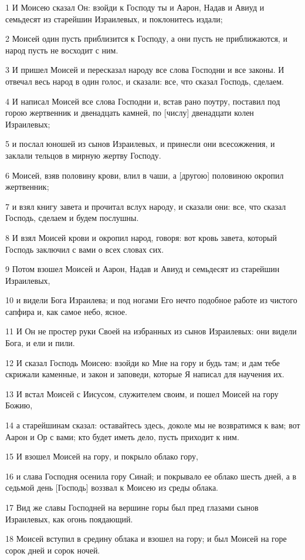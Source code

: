 \par 1 И Моисею сказал Он: взойди к Господу ты и Аарон, Надав и Авиуд и семьдесят из старейшин Израилевых, и поклонитесь издали;
\par 2 Моисей один пусть приблизится к Господу, а они пусть не приближаются, и народ пусть не восходит с ним.
\par 3 И пришел Моисей и пересказал народу все слова Господни и все законы. И отвечал весь народ в один голос, и сказали: все, что сказал Господь, сделаем.
\par 4 И написал Моисей все слова Господни и, встав рано поутру, поставил под горою жертвенник и двенадцать камней, по [числу] двенадцати колен Израилевых;
\par 5 и послал юношей из сынов Израилевых, и принесли они всесожжения, и заклали тельцов в мирную жертву Господу.
\par 6 Моисей, взяв половину крови, влил в чаши, а [другою] половиною окропил жертвенник;
\par 7 и взял книгу завета и прочитал вслух народу, и сказали они: все, что сказал Господь, сделаем и будем послушны.
\par 8 И взял Моисей крови и окропил народ, говоря: вот кровь завета, который Господь заключил с вами о всех словах сих.
\par 9 Потом взошел Моисей и Аарон, Надав и Авиуд и семьдесят из старейшин Израилевых,
\par 10 и видели Бога Израилева; и под ногами Его нечто подобное работе из чистого сапфира и, как самое небо, ясное.
\par 11 И Он не простер руки Своей на избранных из сынов Израилевых: они видели Бога, и ели и пили.
\par 12 И сказал Господь Моисею: взойди ко Мне на гору и будь там; и дам тебе скрижали каменные, и закон и заповеди, которые Я написал для научения их.
\par 13 И встал Моисей с Иисусом, служителем своим, и пошел Моисей на гору Божию,
\par 14 а старейшинам сказал: оставайтесь здесь, доколе мы не возвратимся к вам; вот Аарон и Ор с вами; кто будет иметь дело, пусть приходит к ним.
\par 15 И взошел Моисей на гору, и покрыло облако гору,
\par 16 и слава Господня осенила гору Синай; и покрывало ее облако шесть дней, а в седьмой день [Господь] воззвал к Моисею из среды облака.
\par 17 Вид же славы Господней на вершине горы был пред глазами сынов Израилевых, как огонь поядающий.
\par 18 Моисей вступил в средину облака и взошел на гору; и был Моисей на горе сорок дней и сорок ночей.


